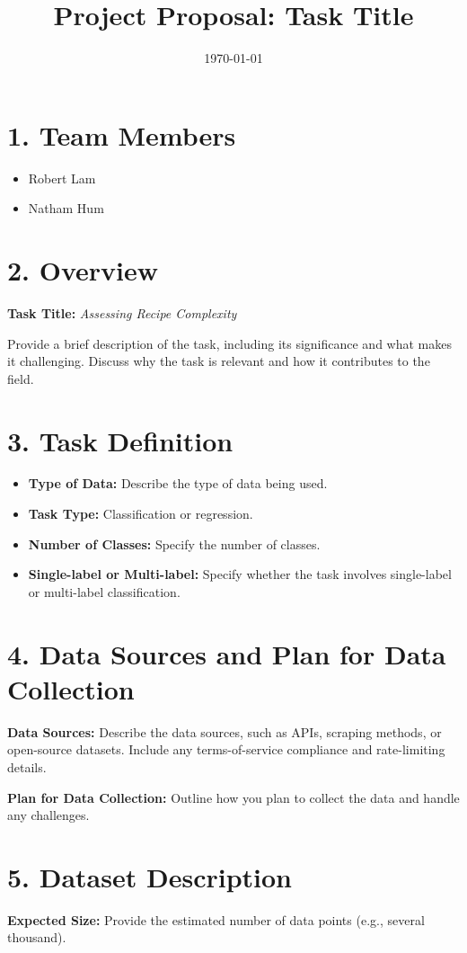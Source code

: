 \documentclass{article}
\title{Project Proposal: Task Title}
\date{\today}
\begin{document}
\maketitle

\section*{1. Team Members}
\begin{itemize}
    \item Robert Lam
    \item Natham Hum
\end{itemize}

\section*{2. Overview}
\textbf{Task Title:} \textit{Assessing Recipe Complexity}

Provide a brief description of the task, including its significance and what makes it challenging. Discuss why the task is relevant and how it contributes to the field.

\section*{3. Task Definition}
\begin{itemize}
    \item \textbf{Type of Data:} Describe the type of data being used.
    \item \textbf{Task Type:} Classification or regression.
    \item \textbf{Number of Classes:} Specify the number of classes.
    \item \textbf{Single-label or Multi-label:} Specify whether the task involves single-label or multi-label classification.
\end{itemize}

\section*{4. Data Sources and Plan for Data Collection}
\textbf{Data Sources:} Describe the data sources, such as APIs, scraping methods, or open-source datasets. Include any terms-of-service compliance and rate-limiting details.

\textbf{Plan for Data Collection:} Outline how you plan to collect the data and handle any challenges.

\section*{5. Dataset Description}
\textbf{Expected Size:} Provide the estimated number of data points (e.g., several thousand).
\end{document}
